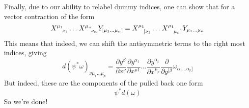 Finally, due to our ability to relabel dummy indices, one can show that for a vector contraction of the form 
\[
	X \indices{ ^{ \mu_1 }_{ \nu_1 }} \dots X \indices{ ^{ \mu_{ n  } }_{ \nu_{ n }  }} Y_{ [  \mu_1 \dots \mu_{ n  } ] }  = X \indices{ ^{ \mu_1 }_{ [ \nu _{ 1 }}} \dots X \indices{ ^{ \mu_1 } _{ \mu_{ n } ] } } Y_{ \mu_1 \dots \mu_{ n }}   
\] 
This means that indeed, we can shift the antisymmetric terms to the right most indices, giving 
\[
	d ( \psi ^ * \omega  )_{ \nu \mu_1 \dots \mu_{ p }  } = \frac{\partial  y ^{ \beta } }{\partial x^{ \nu  } } \frac{\partial  y ^{ \alpha_1   }}{\partial x^{ \mu 1 }} \dots \frac{\partial  y ^{ \alpha_p  }}{\partial x^{ \mu_{ p  } }} \frac{\partial  }{\partial y ^{ [\beta   }} \omega _{ \alpha_1 \dots \alpha_{ p } ]}  
\] But indeed, these are the components  
of the pulled back one form 
\[
	\psi^ * d( \omega  ) 
\] So we're done! 


